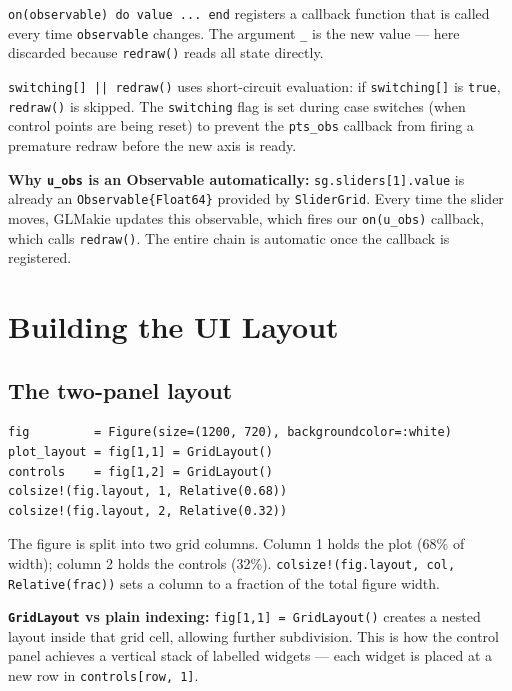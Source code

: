 \documentclass[12pt, a4paper]{article}
\newcommand{\cd}[1]{\texttt{#1}}
\begin{document}
\cd{on(observable) do value ... end} registers a callback
function that is called every time \cd{observable} changes.
The argument \cd{\_} is the new value --- here discarded
because \cd{redraw()} reads all state directly.

\cd{switching[] || redraw()} uses short-circuit evaluation:
if \cd{switching[]} is \cd{true}, \cd{redraw()} is skipped.
The \cd{switching} flag is set during case switches
(when control points are being reset) to prevent the
\cd{pts\_obs} callback from firing a premature redraw
before the new axis is ready.

\begin{notebox}
\textbf{Why \cd{u\_obs} is an Observable automatically:}
\cd{sg.sliders[1].value} is already an \cd{Observable\{Float64\}}
provided by \cd{SliderGrid}. Every time the slider moves,
GLMakie updates this observable, which fires our
\cd{on(u\_obs)} callback, which calls \cd{redraw()}.
The entire chain is automatic once the callback is registered.
\end{notebox}


\section{Building the UI Layout}

\subsection{The two-panel layout}

\begin{verbatim}
fig         = Figure(size=(1200, 720), backgroundcolor=:white)
plot_layout = fig[1,1] = GridLayout()
controls    = fig[1,2] = GridLayout()
colsize!(fig.layout, 1, Relative(0.68))
colsize!(fig.layout, 2, Relative(0.32))
\end{verbatim}

The figure is split into two grid columns.
Column 1 holds the plot (68\% of width);
column 2 holds the controls (32\%).
\cd{colsize!(fig.layout, col, Relative(frac))} sets a
column to a fraction of the total figure width.

\begin{notebox}
\textbf{\cd{GridLayout} vs plain indexing:}
\cd{fig[1,1] = GridLayout()} creates a nested layout
inside that grid cell, allowing further subdivision.
This is how the control panel achieves a vertical stack
of labelled widgets --- each widget is placed at a new
row in \cd{controls[row, 1]}.
\end{notebox}
\end{document}
